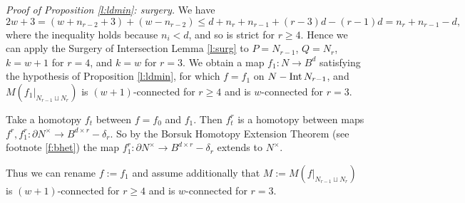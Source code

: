 \documentclass[12pt]{article}
\def\pr{\mathop{\fam0 pr}}
\def\diag{\delta}
\def\Int{\mathop{\fam0 Int}}
\theoremstyle{plain}
\theoremstyle{definition}
\begin{document}
\smallskip
{\it Proof of Proposition \ref{l:ldmin}: surgery.}
We have
$$2w+3=(w+n_{r-2}+3)+(w-n_{r-2})\le d+n_r+n_{r-1}+(r-3)d-(r-1)d=n_r+n_{r-1}-d,$$
where the inequality holds because $n_i<d$, and so is strict for $r\ge4$.
Hence we can apply the Surgery of Intersection Lemma \ref{l:surg} to $P=N_{r-1}$, $Q=N_r$, $k=w+1$ for $r=4$, and $k=w$ for $r=3$.
We obtain a map $f_1:N\to B^d$ satisfying the hypothesis of Proposition \ref{l:ldmin}, for which $f=f_1$ on
$N-\Int N_{r-1}$, and $M(f_1|_{N_{r-1}\sqcup N_r})$ is $(w+1)$-connected for $r\ge4$ and is $w$-connected for $r=3$.

Take a homotopy $f_t$ between $f=f_0$ and $f_1$.
Then $f_t^r$ is a homotopy between maps $f^r,f_1^r:\partial N^\times\to B^{d\times r}-\diag_r$.
So by the Borsuk Homotopy Extension Theorem (see footnote \ref{f:bhet}) the map
$f_1^r:\partial N^\times\to B^{d\times r}-\diag_r$ extends to $N^\times$.

Thus we can rename $f:=f_1$ and assume additionally that $M:=M(f|_{N_{r-1}\sqcup N_r})$ is $(w+1)$-connected for $r\ge4$ and is $w$-connected for $r=3$.
\end{document}
